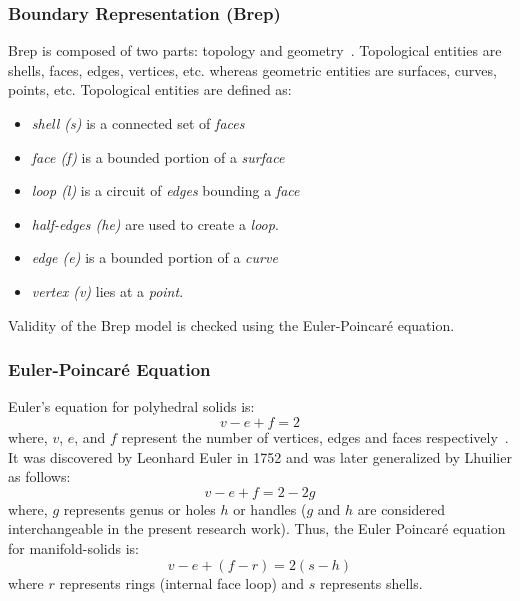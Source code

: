 \subsubsection{Boundary Representation (Brep)}

Brep is composed of two parts: topology and geometry~\cite{Hegde2013}. Topological entities are shells, faces, edges, vertices, etc. whereas geometric entities are surfaces, curves, points, etc. Topological entities are defined as:

\begin{itemize}
[noitemsep,topsep=2pt,parsep=2pt,partopsep=2pt]
\item {\em shell (s)}  is a connected set of {\em faces}
\item {\em face (f)} is a bounded portion of a {\em surface}
\item {\em loop (l)} is a circuit of {\em edges} bounding a {\em face}
\item {\em half-edges (he)} are used to create a {\em loop}.
\item {\em edge (e)} is a bounded portion of a {\em curve}
\item {\em vertex (v)} lies at a {\em point}. 
\end{itemize}

Validity of the Brep model is checked using the Euler-Poincar\'e equation.

\subsubsection{Euler-Poincar\'e Equation}
Euler's equation for polyhedral solids is: \begin{equation}\label{eqn:manifoldsolid}v - e + f = 2\end{equation} where, $v$, $e$, and $f$ represent the number of vertices, edges and faces respectively~\cite{Hegde2013}. It was discovered by Leonhard Euler in 1752 and was later generalized by Lhuilier \cite{Krishnamurti2002} as follows: \begin{equation}\label{eqn:genmanifoldsolid}v - e + f = 2 - 2g\end{equation} where, $g$ represents genus or holes $h$ or handles ($g$ and $h$ are considered interchangeable in the present research work). Thus, the Euler Poincar\'e equation for manifold-solids is:
\begin{equation}
v - e + (f - r) = 2 (s - h)
\label{eqn:topoval:manifold}
\end{equation} where $r$ represents rings (internal face loop) and $s$ represents shells.


